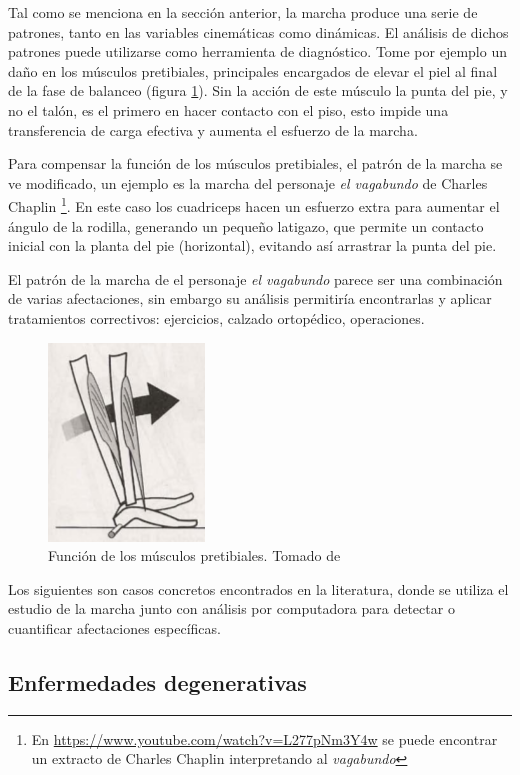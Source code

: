 Tal como se menciona en la sección anterior, la marcha produce una serie de patrones, tanto en las variables cinemáticas como dinámicas. El análisis de dichos patrones puede utilizarse como herramienta de diagnóstico. Tome por ejemplo un daño en los músculos pretibiales, principales encargados de elevar el piel al final de la fase de balanceo (figura \ref{fig:heel_rocker}). Sin la acción de este músculo la punta del pie, y no el talón, es el primero en hacer contacto con el piso, esto impide una transferencia de carga efectiva y aumenta el esfuerzo de la marcha.

Para compensar la función de los músculos pretibiales, el patrón de la marcha se ve modificado, un ejemplo es la marcha del personaje \emph{el vagabundo} de Charles Chaplin \footnote{En \url{https://www.youtube.com/watch?v=L277pNm3Y4w} se puede encontrar un extracto de Charles Chaplin interpretando al \emph{vagabundo}}. En este caso los cuadriceps hacen un esfuerzo extra para aumentar el ángulo de la rodilla, generando un pequeño latigazo, que permite un contacto inicial con la planta del pie (horizontal), evitando así arrastrar la punta del pie.

El patrón de la marcha de el personaje \emph{el vagabundo} parece ser una combinación de varias afectaciones, sin embargo su análisis permitiría encontrarlas y aplicar tratamientos correctivos: ejercicios, calzado ortopédico, operaciones. 

\begin{figure}
    \centering
    \includegraphics[width=0.2\textheight]{imagenes/heel_rocker}
    \caption{Función de los músculos pretibiales. Tomado de \citep{perry}}
    \label{fig:heel_rocker}
\end{figure}

Los siguientes son casos concretos encontrados en la literatura, donde se utiliza el estudio de la marcha junto con análisis por computadora para detectar o cuantificar afectaciones específicas.

\subsection{Enfermedades degenerativas}

